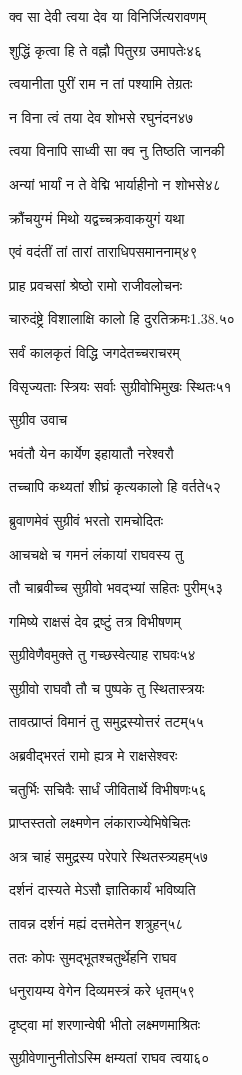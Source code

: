 क्व सा देवी त्वया देव या विनिर्जित्यरावणम्

शुद्धिं कृत्वा हि ते वह्नौ पितुरग्र उमापतेः४६

त्वयानीता पुरीं राम न तां पश्यामि तेग्रतः

न विना त्वं तया देव शोभसे रघुनंदन४७

त्वया विनापि साध्वी सा क्व नु तिष्ठति जानकी

अन्यां भार्यां न ते वेद्मि भार्याहीनो न शोभसे४८

क्रौंचयुग्मं मिथो यद्वच्चक्रवाकयुगं यथा

एवं वदंतीं तां तारां ताराधिपसमाननाम्४९

प्राह प्रवचसां श्रेष्ठो रामो राजीवलोचनः

चारुदंष्ट्रे विशालाक्षि कालो हि दुरतिक्रमः1.38.५०

सर्वं कालकृतं विद्धि जगदेतच्चराचरम्

विसृज्यताः स्त्रियः सर्वाः सुग्रीवोभिमुखः स्थितः५१

सुग्रीव उवाच

भवंतौ येन कार्येण इहायातौ नरेश्वरौ

तच्चापि कथ्यतां शीघ्रं कृत्यकालो हि वर्तते५२

ब्रुवाणमेवं सुग्रीवं भरतो रामचोदितः

आचचक्षे च गमनं लंकायां राघवस्य तु

तौ चाब्रवीच्च सुग्रीवो भवद्भ्यां सहितः पुरीम्५३

गमिष्ये राक्षसं देव द्रष्टुं तत्र विभीषणम्

सुग्रीवेणैवमुक्ते तु गच्छस्वेत्याह राघवः५४

सुग्रीवो राघवौ तौ च पुष्पके तु स्थितास्त्रयः

तावत्प्राप्तं विमानं तु समुद्रस्योत्तरं तटम्५५

अब्रवीद्भरतं रामो ह्यत्र मे राक्षसेश्वरः

चतुर्भिः सचिवैः सार्धं जीवितार्थे विभीषणः५६

प्राप्तस्ततो लक्ष्मणेन लंकाराज्येभिषेचितः

अत्र चाहं समुद्रस्य परेपारे स्थितस्त्र्यहम्५७

दर्शनं दास्यते मेऽसौ ज्ञातिकार्यं भविष्यति

तावन्न दर्शनं मह्यं दत्तमेतेन शत्रुहन्५८

ततः कोपः सुमद्भूतश्चतुर्थेहनि राघव

धनुरायम्य वेगेन दिव्यमस्त्रं करे धृतम्५९

दृष्ट्वा मां शरणान्वेषी भीतो लक्ष्मणमाश्रितः

सुग्रीवेणानुनीतोऽस्मि क्षम्यतां राघव त्वया६०

